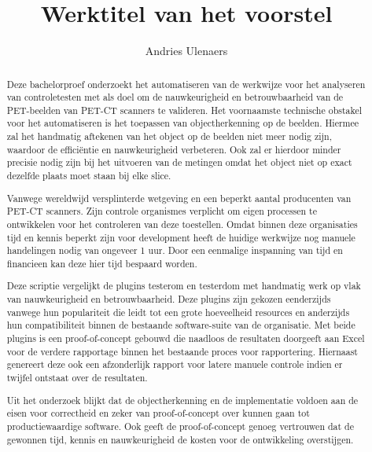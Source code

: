 \documentclass{hogent-article}
\title{Werktitel van het voorstel}
\author{Andries Ulenaers}
\begin{document}
\begin{abstract}
  Deze bachelorproef onderzoekt het automatiseren van de werkwijze voor het analyseren van controletesten met als doel om de nauwkeurigheid en betrouwbaarheid van de PET-beelden van PET-CT scanners te valideren. Het voornaamste technische obstakel voor het automatiseren is het toepassen van objectherkenning op de beelden. Hiermee zal het handmatig aftekenen van het object op de beelden niet meer nodig zijn, waardoor de efficiëntie en nauwkeurigheid verbeteren. Ook zal er hierdoor minder precisie nodig zijn bij het uitvoeren van de metingen omdat het object niet op exact dezelfde plaats moet staan bij elke slice.

  Vanwege wereldwijd versplinterde wetgeving en een beperkt aantal producenten van PET-CT scanners. Zijn controle organismes verplicht om eigen processen te ontwikkelen voor het controleren van deze toestellen. Omdat binnen deze organisaties tijd en kennis beperkt zijn voor development heeft de huidige werkwijze nog manuele handelingen nodig van ongeveer 1 uur. Door een eenmalige inspanning van tijd en financieen kan deze hier tijd bespaard worden.

  Deze scriptie vergelijkt de plugins testerom en testerdom met handmatig werk op vlak van nauwkeurigheid en betrouwbaarheid. Deze plugins zijn gekozen eenderzijds vanwege hun populariteit die leidt tot een grote hoeveelheid resources en anderzijds hun compatibiliteit binnen de bestaande software-suite van de organisatie. Met beide plugins is een proof-of-concept gebouwd die naadloos de resultaten doorgeeft aan Excel voor de verdere rapportage binnen het bestaande proces voor rapportering. Hiernaast genereert deze ook een afzonderlijk rapport voor latere manuele controle indien er twijfel ontstaat over de resultaten.

  Uit het onderzoek blijkt dat de objectherkenning en de implementatie voldoen aan de eisen voor correctheid en zeker van proof-of-concept over kunnen gaan tot productiewaardige software. Ook geeft de proof-of-concept genoeg vertrouwen dat de gewonnen tijd, kennis en nauwkeurigheid de kosten voor de ontwikkeling overstijgen.
  
\end{abstract}

\tableofcontents

\bigskip

\end{document}
